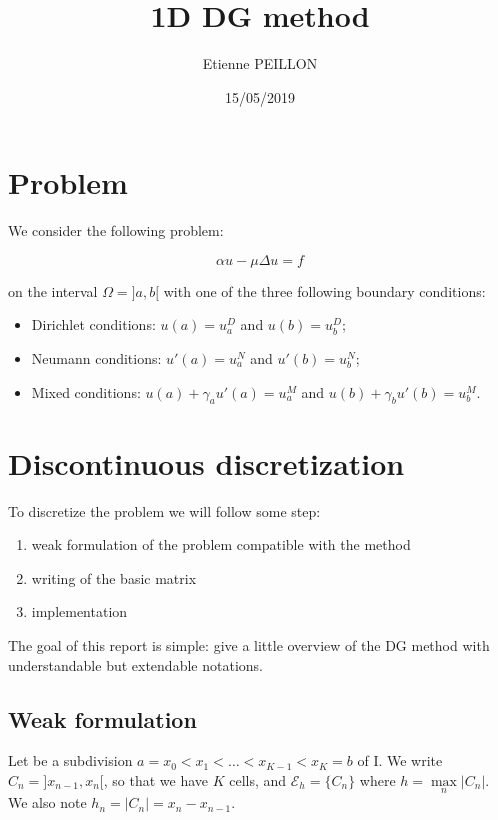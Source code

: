 \documentclass[a4paper,10pt]{article}
\title{1D DG method}
\author{Etienne PEILLON}
\date{15/05/2019}
\begin{document}
 \maketitle
 
 \section{Problem}
 
 We consider the following problem:
 
 \begin{equation} \label{eq:initial}
  \alpha u - \mu \Delta u = f
 \end{equation}

 on the interval $\Omega = ]a,b[$ with one of the three following boundary conditions:
 \begin{itemize}
  \item Dirichlet conditions: $u(a) = u_a^D$ and $u(b) = u_b^D$;
  \item Neumann conditions: $u'(a) = u_a^N$ and $u'(b) = u_b^N$;
  \item Mixed conditions: $u(a) + \gamma_a u'(a) = u_a^M$ and $u(b) + \gamma_b u'(b) = u_b^M$.
 \end{itemize}

 \section{Discontinuous discretization}
 
 To discretize the problem we will follow some step:
 \begin{enumerate}
  \item weak formulation of the problem compatible with the method
  \item writing of the basic matrix
  \item implementation
 \end{enumerate}
 
 The goal of this report is simple: give a little overview of the DG method with understandable but 
extendable notations.

 \subsection{Weak formulation}
 
 Let be a subdivision $a = x_0 < x_1 < \dots < x_{K-1} < x_K = b$ of I. We write $C_n = 
]x_{n-1},x_n[$, so that we have $K$ cells, and $\mathcal{E}_h = \{ C_n \}$ where $h = \max 
\limits_{n} |C_n|$. We also note $h_n = |C_n| = x_n - x_{n-1}$.
 
\end{document}
